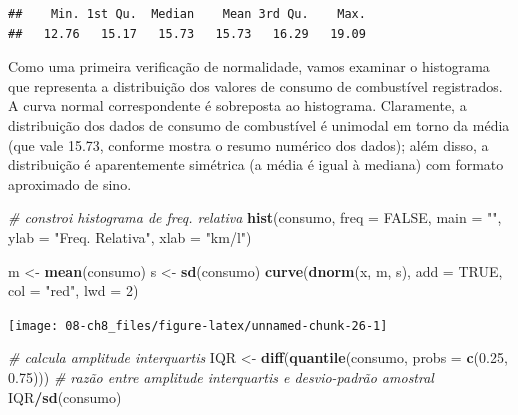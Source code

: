 \documentclass[
]{book}
\newenvironment{Shaded}{\begin{snugshade}}{\end{snugshade}}
\newcommand{\CommentTok}[1]{\textcolor[rgb]{0.56,0.35,0.01}{\textit{#1}}}
\newcommand{\DataTypeTok}[1]{\textcolor[rgb]{0.13,0.29,0.53}{#1}}
\newcommand{\DecValTok}[1]{\textcolor[rgb]{0.00,0.00,0.81}{#1}}
\newcommand{\FloatTok}[1]{\textcolor[rgb]{0.00,0.00,0.81}{#1}}
\newcommand{\KeywordTok}[1]{\textcolor[rgb]{0.13,0.29,0.53}{\textbf{#1}}}
\newcommand{\NormalTok}[1]{#1}
\newcommand{\OperatorTok}[1]{\textcolor[rgb]{0.81,0.36,0.00}{\textbf{#1}}}
\newcommand{\OtherTok}[1]{\textcolor[rgb]{0.56,0.35,0.01}{#1}}
\newcommand{\StringTok}[1]{\textcolor[rgb]{0.31,0.60,0.02}{#1}}
\theoremstyle{definition}
\theoremstyle{definition}
\theoremstyle{definition}
\theoremstyle{remark}
\begin{document}
\begin{verbatim}
##    Min. 1st Qu.  Median    Mean 3rd Qu.    Max. 
##   12.76   15.17   15.73   15.73   16.29   19.09
\end{verbatim}

Como uma primeira verificação de normalidade, vamos examinar o histograma que representa a distribuição dos valores de consumo de combustível registrados. A curva normal correspondente é sobreposta ao histograma. Claramente, a distribuição dos dados de consumo de combustível é unimodal em torno da média (que vale 15.73, conforme mostra o resumo numérico dos dados); além disso, a distribuição é aparentemente simétrica (a média é igual à mediana) com formato aproximado de sino.

\begin{Shaded}
\begin{Highlighting}[]
\CommentTok{# constroi histograma de freq. relativa}
\KeywordTok{hist}\NormalTok{(consumo, }\DataTypeTok{freq =} \OtherTok{FALSE}\NormalTok{,  }\DataTypeTok{main =} \StringTok{""}\NormalTok{, }
     \DataTypeTok{ylab =} \StringTok{"Freq. Relativa"}\NormalTok{, }\DataTypeTok{xlab =} \StringTok{"km/l"}\NormalTok{)}

\NormalTok{  m <-}\StringTok{ }\KeywordTok{mean}\NormalTok{(consumo)}
\NormalTok{  s <-}\StringTok{ }\KeywordTok{sd}\NormalTok{(consumo)}
  \KeywordTok{curve}\NormalTok{(}\KeywordTok{dnorm}\NormalTok{(x, m, s), }\DataTypeTok{add =} \OtherTok{TRUE}\NormalTok{, }\DataTypeTok{col =} \StringTok{"red"}\NormalTok{, }\DataTypeTok{lwd =} \DecValTok{2}\NormalTok{)}
\end{Highlighting}
\end{Shaded}

\begin{center}\texttt{[image: 08-ch8\_files/figure-latex/unnamed-chunk-26-1]} \end{center}

\begin{Shaded}
\begin{Highlighting}[]
\CommentTok{# calcula amplitude interquartis}
\NormalTok{IQR <-}\StringTok{ }\KeywordTok{diff}\NormalTok{(}\KeywordTok{quantile}\NormalTok{(consumo, }\DataTypeTok{probs =} \KeywordTok{c}\NormalTok{(}\FloatTok{0.25}\NormalTok{, }\FloatTok{0.75}\NormalTok{))) }
\CommentTok{# razão entre amplitude interquartis e desvio-padrão amostral}
\NormalTok{IQR}\OperatorTok{/}\KeywordTok{sd}\NormalTok{(consumo)}
\end{Highlighting}
\end{Shaded}
\end{document}
